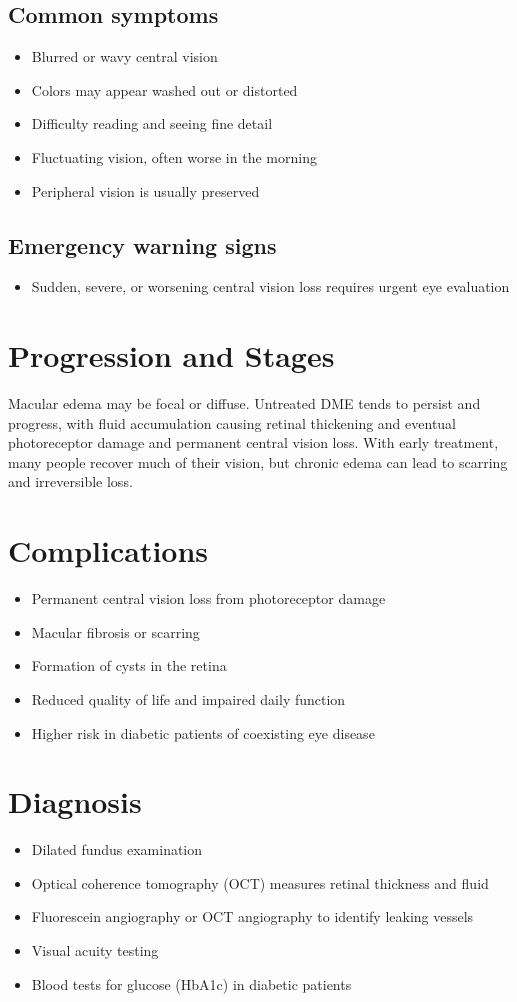 \subsection{Common symptoms}
\begin{itemize}[noitemsep]
  \item Blurred or wavy central vision
  \item Colors may appear washed out or distorted
  \item Difficulty reading and seeing fine detail
  \item Fluctuating vision, often worse in the morning
  \item Peripheral vision is usually preserved
\end{itemize}
\subsection{Emergency warning signs}
\begin{itemize}[noitemsep]
  \item Sudden, severe, or worsening central vision loss requires urgent eye evaluation
\end{itemize}
\section{Progression and Stages}
Macular edema may be focal or diffuse. Untreated DME tends to persist and progress, with fluid accumulation causing retinal thickening and eventual photoreceptor damage and permanent central vision loss. With early treatment, many people recover much of their vision, but chronic edema can lead to scarring and irreversible loss.
\section{Complications}
\begin{itemize}[noitemsep]
  \item Permanent central vision loss from photoreceptor damage
  \item Macular fibrosis or scarring
  \item Formation of cysts in the retina
  \item Reduced quality of life and impaired daily function
  \item Higher risk in diabetic patients of coexisting eye disease
\end{itemize}
\section{Diagnosis}
\begin{itemize}[noitemsep]
  \item Dilated fundus examination
  \item Optical coherence tomography (OCT) measures retinal thickness and fluid
  \item Fluorescein angiography or OCT angiography to identify leaking vessels
  \item Visual acuity testing
  \item Blood tests for glucose (HbA1c) in diabetic patients
\end{itemize}
